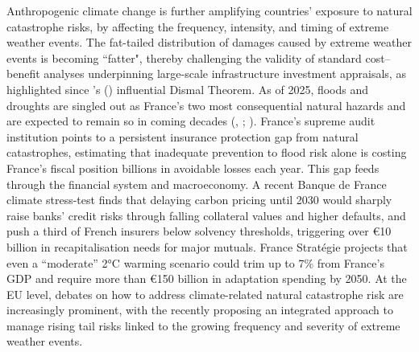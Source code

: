Anthropogenic climate change is further amplifying countries' exposure to natural catastrophe risks, by affecting the frequency, intensity, and timing of extreme weather events. The fat-tailed distribution of damages caused by extreme weather events is becoming ``fatter",
thereby challenging the validity of standard cost–benefit analyses underpinning large-scale infrastructure investment appraisals, as highlighted since \citeauthor{weitzman2009modeling}’s (\citeyear{weitzman2009modeling}) influential Dismal Theorem. As of 2025, floods and droughts are singled out as France’s two most consequential natural hazards  and are expected to remain so in coming decades (\citeauthor{CCR2023}, \citeyear{CCR2023}; \citeyear{CCR2025BilanCatNat}). France’s supreme audit institution \citep{CourDesComptes2022} points to a persistent insurance protection gap from natural catastrophes, estimating that inadequate prevention to flood risk alone is costing France’s fiscal position billions in avoidable losses each year. This gap feeds through the financial system and macroeconomy. A recent Banque de France climate stress-test \citep{ACPR2024ClimateStressTest} finds that delaying carbon pricing until 2030 would sharply raise banks’ credit risks through falling collateral values and higher defaults, and push a third of French insurers below solvency thresholds, triggering over €10 billion in recapitalisation needs for major mutuals. France Stratégie \citep{pisani2023economic} projects that even a ``moderate” 2°C warming scenario could trim up to 7\% from France's GDP and require more than €150 billion in adaptation spending by 2050. At the EU level, debates on how to address climate-related natural catastrophe risk are increasingly prominent, with the \cite{ECB2024insurancegap} recently proposing an integrated approach to manage rising tail risks linked to the growing frequency and severity of extreme weather events. \\

